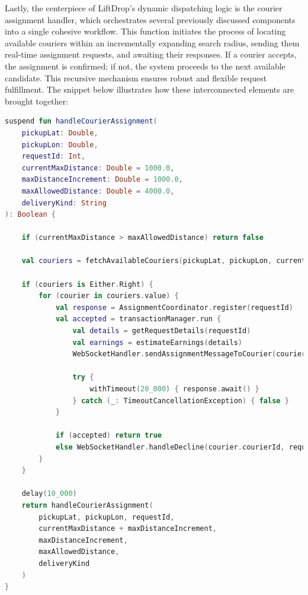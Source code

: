Lastly, the centerpiece of LiftDrop’s dynamic dispatching logic is the courier assignment handler, which orchestrates several previously discussed components into a single cohesive workflow. This function initiates the process of locating available couriers within an incrementally expanding search radius, sending them real-time assignment requests, and awaiting their responses. If a courier accepts, the assignment is confirmed; if not, the system proceeds to the next available candidate. This recursive mechanism ensures robust and flexible request fulfillment. The snippet below illustrates how these interconnected elements are brought together:


\begin{lstlisting}[language=Kotlin, caption={Handling Courier Assignments (Simplified Pseudocode)}]
suspend fun handleCourierAssignment(
    pickupLat: Double,
    pickupLon: Double,
    requestId: Int,
    currentMaxDistance: Double = 1000.0,
    maxDistanceIncrement: Double = 1000.0,
    maxAllowedDistance: Double = 4000.0,
    deliveryKind: String
): Boolean {

    if (currentMaxDistance > maxAllowedDistance) return false

    val couriers = fetchAvailableCouriers(pickupLat, pickupLon, currentMaxDistance, deliveryKind)

    if (couriers is Either.Right) {
        for (courier in couriers.value) {
            val response = AssignmentCoordinator.register(requestId)
            val accepted = transactionManager.run {
                val details = getRequestDetails(requestId)
                val earnings = estimateEarnings(details)
                WebSocketHandler.sendAssignmentMessageToCourier(courier.courierId, details)

                try {
                    withTimeout(20_000) { response.await() }
                } catch (_: TimeoutCancellationException) { false }
            }

            if (accepted) return true
            else WebSocketHandler.handleDecline(courier.courierId, requestId)
        }
    }

    delay(10_000)
    return handleCourierAssignment(
        pickupLat, pickupLon, requestId,
        currentMaxDistance + maxDistanceIncrement,
        maxDistanceIncrement,
        maxAllowedDistance,
        deliveryKind
    )
}

\end{lstlisting}




